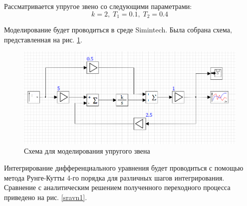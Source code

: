 	Рассматривается упругое звено со следующими параметрами:
	\begin{equation*}
		k=2,\;T_1 = 0.1,\; T_2 = 0.4
	\end{equation*}

	Моделирование будет проводиться в среде Simintech. Была собрана схема, представленная на рис. \ref{scheme1}.
	\begin{figure}[h]
		\centering\includegraphics[width=.7\textwidth]{png/scheme1.png}
		\caption{Схема для моделирования упругого звена}
		\label{scheme1}
	\end{figure}
	
	Интегрирование дифференциального уравнения будет проводиться с помощью метода Рунге-Кутты 4-го порядка для различных шагов интегрирования. Сравнение с аналитическим решением полученного переходного процесса приведено на рис. \ref{sravn1}.
	
